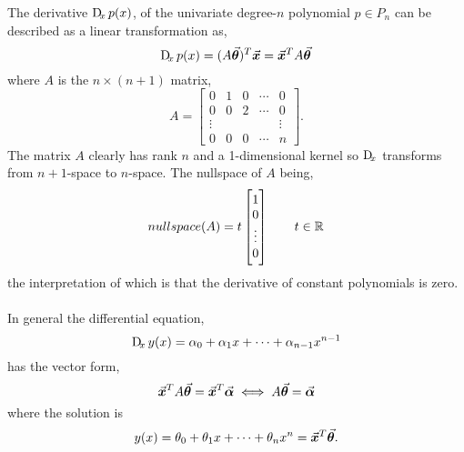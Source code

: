 \documentclass[../MathsNotesBase.tex]{subfiles}
\begin{document}
{		\biggerskip
		The derivative $\Dif_x p(x)$, of the univariate degree-$n$ polynomial ${ p \in P_n }$ can be described as a linear transformation as,
			\[ \Dif_x p(x) = (A\vtheta)^T \x = \x^T A\vtheta \]
			where $A$ is the ${ n \times (n+1) }$ matrix,
			\[ A = \begin{bmatrix}
					0 & 1 & 0 & \cdots & 0\\
					0 & 0 & 2 & \cdots & 0\\
					\vdots &  &  &  & \vdots\\
					0 & 0 & 0 & \cdots & n
					\end{bmatrix}.
			\]
		The matrix $A$ clearly has rank $n$ and a 1-dimensional kernel so $\Dif_x$ transforms from $n+1$-space to $n$-space. The nullspace of $A$ being,
		\[ nullspace(A) = t\begin{bmatrix}1\\0\\\vdots\\0\end{bmatrix} \hspace{20pt} t \in \mathbb{R}^{} \]
		the interpretation of which is that the derivative of constant polynomials is zero.\\\\

		
		\medskip
		In general the differential equation,
		\begin{equation}
			\Dif_x y(x) = \alpha_0 + \alpha_1 x + \cdots + \alpha_{n-1} x^{n-1}
		\end{equation}
		has the vector form,
		\begin{equation}\label{eq:first-order-lin-diffeq}
			\vec{\bm{x}}^T A\vec{\bm{\theta}} = \vec{\bm{x}}^T \vec{\bm{\alpha}} \iff A\vec{\bm{\theta}} = \vec{\bm{\alpha}}
		\end{equation}
		where the solution is
		\[ y(x) = \theta_0 + \theta_1 x + \cdots + \theta_n x^n = \vec{\bm{x}}^T \vec{\bm{\theta}}. \]
		
}
\end{document}
